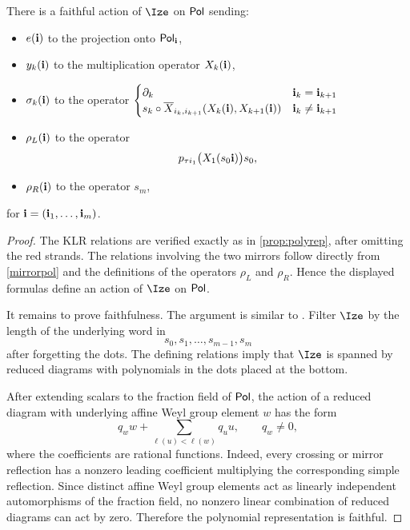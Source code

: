 \begin{theorem}
\label{thm:tRPol}
    There is a faithful action of $\tR$ on $\mathsf{Pol}$ sending:
    \begin{itemize}
        \item $e(\mathbf{i})$ to the projection onto $\mathsf{Pol}_{\mathbf{i}}$,
         \item  $y_k(\mathbf{i})$ to the multiplication operator $X_k(\mathbf{i})$,
         \item  \(\sigma_k(\mathbf{i}) \) to the operator \(
    \begin{cases}
      \partial_k & \mathbf{i}_k=\mathbf{i}_{k+1}\\
      s_k \circ \overline{X}_{i_k,i_{k+1}}(X_k(\mathbf{i}),X_{k+1}(\mathbf{i})) &\mathbf{i}_k\neq \mathbf{i}_{k+1}
    \end{cases}
\)
\item $\rho_L(\mathbf{i})$ to the operator
\[
p_{\tau i_1}\bigl(X_1(s_0\mathbf{i})\bigr)s_0,
\] 
\item $\rho_R(\mathbf{i})$ to the operator $s_m$,
    \end{itemize}
    for $\mathbf{i}=(\mathbf{i}_1,\ldots,\mathbf{i}_m)$.
\end{theorem}

\begin{proof}
The KLR relations are verified exactly as in
\cref{prop:polyrep}, after omitting the red strands. The relations
involving the two mirrors follow directly from \cref{mirrorpol} and
the definitions of the operators \(\rho_L\) and \(\rho_R\). Hence the
displayed formulas define an action of \(\tR\) on \(\mathsf{Pol}\).

It remains to prove faithfulness. The argument is similar to
  \cite[Thm.~4.20]{KTWWY19}. Filter
\(\tR\) by the length of the underlying word in
\[
    s_0,s_1,\ldots,s_{m-1},s_m
\]
after forgetting the dots. The defining relations imply that
\(\tR\) is spanned by reduced diagrams with polynomials in the dots
placed at the bottom.

After extending scalars to the fraction field of \(\mathsf{Pol}\), the action
of a reduced diagram with underlying affine Weyl group element \(w\)
has the form
\[
    q_w w
    +
    \sum_{\ell(u)<\ell(w)} q_u u,
    \qquad
    q_w\neq 0,
\]
where the coefficients are rational functions. Indeed, every
crossing or mirror reflection has a nonzero leading coefficient
multiplying the corresponding simple reflection. Since distinct
affine Weyl group elements act as linearly independent automorphisms
of the fraction field, no nonzero linear combination of reduced
diagrams can act by zero. Therefore the polynomial representation is
faithful.
\end{proof}




